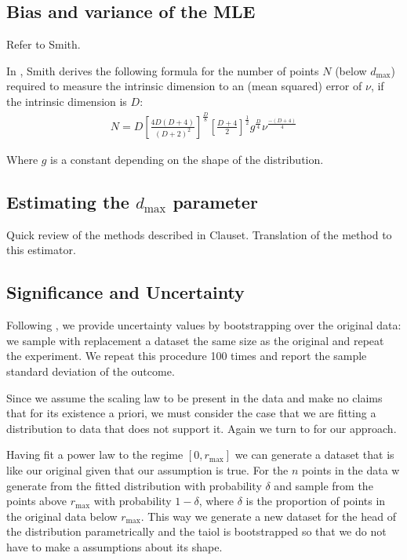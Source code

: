 \documentclass[11pt]{article}
\begin{document}
\subsection{Bias and variance of the MLE}

Refer to Smith.

In \cite{smith1992estimating}, Smith derives the following formula for the number of points $N$ (below $d_{\max}$) required to measure the intrinsic dimension to an (mean squared) error of $\nu$, if the intrinsic dimension is $D$:
\begin{align*}
N = D\left[\frac{4D(D+4)}{(D+2)^2}\right]^{\frac{D}{8}} \left[\frac{D+4}{2}\right]^\frac{1}{2} g^\frac{D}{4} \nu^\frac{-(D+4)}{4}
\end{align*}

Where $g$ is a constant depending on the shape of the distribution.
 
\subsection{Estimating the $d_{\max}$ parameter}

Quick review of the methods described in Clauset. Translation of the method to this estimator. 

\subsection{Significance and Uncertainty}
\label{significance}

Following \cite{clauset2007power}, we provide uncertainty values by bootstrapping over the original data: we sample with replacement a dataset the same size as the original and repeat the experiment. We repeat this procedure 100 times and report the sample standard deviation of the outcome.

Since we assume the scaling law to be present in the data and make no claims that for its existence a priori, we must consider the case that we are fitting a distribution to data that does not support it. Again we turn to \cite{clauset2007power} for our approach.

Having fit a power law to the regime $[0, r_{\max}]$ we can generate a dataset that is like our original given that our assumption is true. For the $n$ points in the data w generate from the fitted distribution with probability $\delta$ and sample from the points above $r_{\max}$ with probability $1 - \delta$, where $\delta$ is the proportion of points in the original data below $r_{\max}$. This way we generate a new dataset for the head of the distribution parametrically and the taiol is bootstrapped so that we do not have to make a assumptions about its shape.
\end{document}
